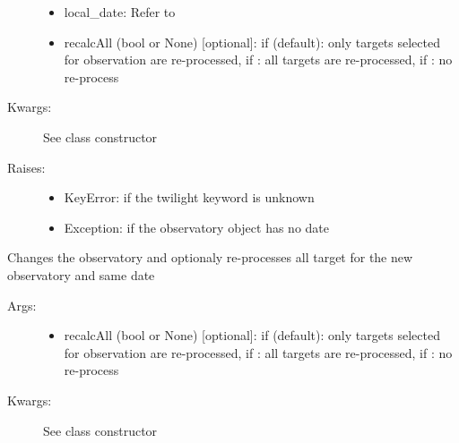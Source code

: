 \documentclass[letterpaper,10pt,english]{sphinxmanual}
\begin{document}
\begin{fulllineitems}
\begin{fulllineitems}
\begin{description}
\begin{itemize}
\item {} 
local\_date: Refer to 

\item {} 
recalcAll (bool or None) {[}optional{]}: if  (default): only targets selected for observation are re-processed, if : all targets are re-processed, if : no re-process

\end{itemize}

\item[{Kwargs:}] \leavevmode
See class constructor

\item[{Raises:}] \leavevmode\begin{itemize}
\item {} 
KeyError: if the twilight keyword is unknown

\item {} 
Exception: if the observatory object has no date

\end{itemize}

\end{description}

\end{fulllineitems}


\begin{fulllineitems}
\label{astroobs:astroobs.Observation.Observation.change_obs}
Changes the observatory and optionaly re-processes all target for the new observatory and same date
\begin{description}
\item[{Args:}] \leavevmode\begin{itemize}
\item {} 
recalcAll (bool or None) {[}optional{]}: if  (default): only targets selected for observation are re-processed, if : all targets are re-processed, if : no re-process

\end{itemize}

\item[{Kwargs:}] \leavevmode
See class constructor


\end{description}
\end{fulllineitems}
\end{fulllineitems}
\end{document}
